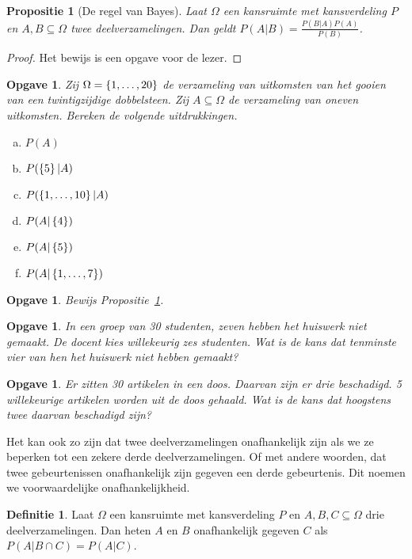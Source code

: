 \documentclass[a4paper]{book}
\newtheorem{proposition}[theorem]{Propositie}
\newtheorem{exercise}[theorem]{Opgave}
\theoremstyle{definition}
\newtheorem{definition}[theorem]{Definitie}
\begin{document}
\begin{proposition}[De regel van Bayes]\label{bayes}
    Laat $\Omega$ een kansruimte met kansverdeling $P$ en $A,B \subseteq \Omega$ twee deelverzamelingen.
    Dan geldt $P(A|B) = \frac{P(B|A)P(A)}{P(B)}$.
\end{proposition}
\begin{proof}
    Het bewijs is een opgave voor de lezer.
\end{proof}

\begin{exercise}
    Zij $\Omega = \set{1,\dots,20}$ de verzameling van uitkomsten van het gooien van een twintigzijdige dobbelsteen.
    Zij $A \subseteq \Omega$ de verzameling van oneven uitkomsten.
    Bereken de volgende uitdrukkingen.
    \begin{enumerate}[a.]
        \item $P(A)$
        \item $P(\set{5}|A)$
        \item $P(\set{1,\dots,10}|A)$
        \item $P(A|\set{4})$
        \item $P(A|\set{5})$
        \item $P(A|\set{1,\dots,7})$
    \end{enumerate}
\end{exercise}

\begin{exercise}
    Bewijs Propositie~\ref{bayes}.
\end{exercise}

\begin{exercise}
In een groep van 30 studenten, zeven hebben het huiswerk niet gemaakt. De docent kies willekeurig zes studenten.
Wat is de kans dat tenminste vier van hen het huiswerk niet hebben gemaakt?
\end{exercise}

\begin{exercise}
Er zitten 30 artikelen in een doos. Daarvan zijn er drie beschadigd.
5 willekeurige artikelen worden uit de doos gehaald. Wat is de kans dat hoogstens twee daarvan beschadigd zijn?
\end{exercise}

Het kan ook zo zijn dat twee deelverzamelingen onafhankelijk zijn als we ze beperken tot een zekere derde deelverzamelingen.
Of met andere woorden, dat twee gebeurtenissen onafhankelijk zijn gegeven een derde gebeurtenis.
Dit noemen we voorwaardelijke onafhankelijkheid.
\begin{definition}
    Laat $\Omega$ een kansruimte met kansverdeling $P$ en $A,B,C \subseteq \Omega$ drie deelverzamelingen.
    Dan heten $A$ en $B$ onafhankelijk gegeven $C$ als $P(A|B \cap C) = P(A|C)$.
\end{definition}
\end{document}
